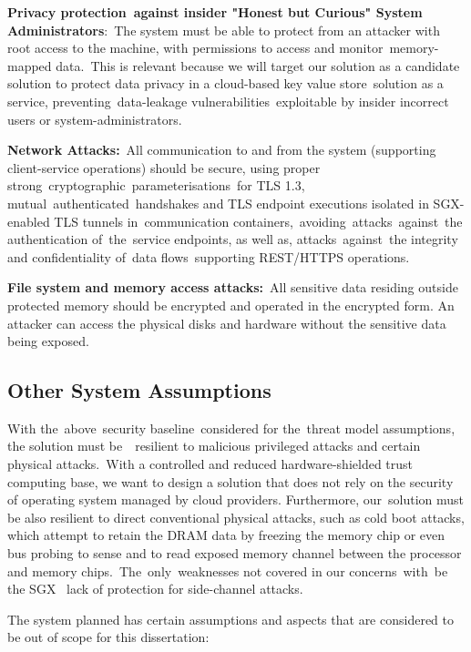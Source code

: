 \textbf{Privacy protection against insider "Honest but Curious" System Administrators}: The system must be able to protect from an attacker with root access to the machine, with permissions to access and monitor memory-mapped data. This is relevant because we will target our solution as a candidate solution to protect data privacy in a cloud-based key value store solution as a service, preventing data-leakage vulnerabilities exploitable by insider incorrect users or system-administrators.

\textbf{Network Attacks:} All communication to and from the system (supporting client-service operations) should be secure, using proper strong cryptographic parameterisations for TLS 1.3, mutual authenticated handshakes and TLS endpoint executions isolated in SGX-enabled TLS tunnels in communication containers, avoiding attacks against the authentication of the service endpoints, as well as, attacks against the integrity and confidentiality of data flows supporting \gls{REST}/\gls{HTTPS} operations.

\textbf{File system and memory access attacks:} All sensitive data residing outside protected memory should be encrypted and operated in the encrypted form. An attacker can access the physical disks and hardware without the sensitive data being exposed.

\subsection{Other System Assumptions}
\label{ssec:other_system_assumptions}

With the above security baseline considered for the threat model assumptions, the solution must be  resilient to malicious privileged attacks and certain physical attacks. With a controlled and reduced hardware-shielded trust computing base, we want to design a solution that does not rely on the security of operating system managed by cloud providers. Furthermore, our solution must be also resilient to direct conventional physical attacks, such as cold boot attacks, which attempt to retain the DRAM data by freezing the memory chip or even bus probing to sense and to read exposed memory channel between the processor and memory chips. The only weaknesses not covered in our concerns with be the SGX  lack of protection for side-channel attacks.

The system planned has certain assumptions and aspects that are considered to be out of scope for this dissertation:


